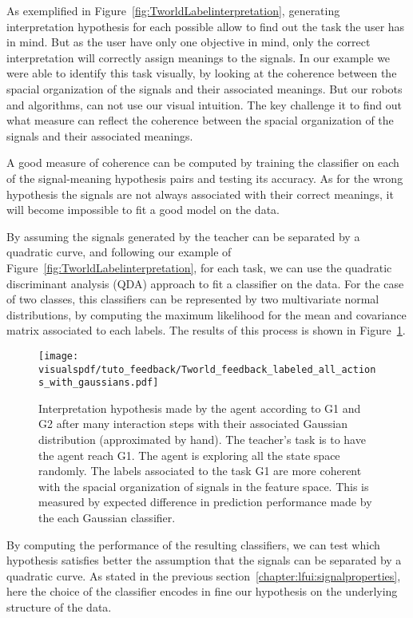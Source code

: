 As exemplified in Figure~\ref{fig:TworldLabelinterpretation}, generating interpretation hypothesis for each possible allow to find out the task the user has in mind. But as the user have only one objective in mind, only the correct interpretation will correctly assign meanings to the signals. In our example we were able to identify this task visually, by looking at the coherence between the spacial organization of the signals and their associated meanings. But our robots and algorithms, can not use our visual intuition. The key challenge it to find out what measure can reflect the coherence between the spacial organization of the signals and their associated meanings.

A good measure of coherence can be computed by training the classifier on each of the signal-meaning hypothesis pairs and testing its accuracy. As for the wrong hypothesis the signals are not always associated with their correct meanings, it will become impossible to fit a good model on the data. 

By assuming the signals generated by the teacher can be separated by a quadratic curve, and following our example of Figure~\ref{fig:TworldLabelinterpretation}, for each task, we can use the  quadratic discriminant analysis (QDA) \cite{lachenbruch1975discriminant} approach to fit a classifier on the data. For the case of two classes, this classifiers can be represented by two multivariate normal distributions, by  computing the maximum likelihood for the mean and covariance matrix associated to each labels. The results of this process is shown in Figure~\ref{fig:TworldLabelGaussian}.

\begin{figure}[!ht]
    \centering
    \texttt{[image: \\visualspdf/tuto\_feedback/Tworld\_feedback\_labeled\_all\_actions\_with\_gaussians.pdf]}
    \caption{Interpretation hypothesis made by the agent according to G1 and G2 after many interaction steps with their associated Gaussian distribution (approximated by hand). The teacher's task is to have the agent reach G1. The agent is exploring all the state space randomly. The labels associated to the task G1 are more coherent with the spacial organization of signals in the feature space. This is measured by expected difference in prediction performance made by the each Gaussian classifier.}
    \label{fig:TworldLabelGaussian}
\end{figure}

By computing the performance of the resulting classifiers, we can test which hypothesis satisfies better the assumption that the signals can be separated by a quadratic curve. As stated in the previous section~\ref{chapter:lfui:signalproperties}, here the choice of the classifier encodes in fine our hypothesis on the underlying structure of the data.

